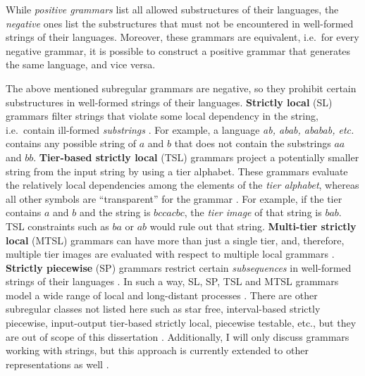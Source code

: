 While \emph{positive grammars} list all allowed substructures of their languages, the \emph{negative} ones list the substructures that must not be encountered in well-formed strings of their languages. Moreover, these grammars are equivalent, i.e.\ for every negative grammar, it is possible to construct a positive grammar that generates the same language, and vice versa.

The above mentioned subregular grammars are negative, so they prohibit certain substructures in well-formed strings of their languages.
\textbf{Strictly local} (SL) grammars filter strings that violate some local dependency in the string, i.e.\ contain ill-formed \emph{substrings} \citep{Heinz-2010-SEL}.
For example, a language \emph{ab, abab, ababab, etc.} contains any possible string of $a$ and $b$ that does not contain the substrings $aa$ and $bb$.
\textbf{Tier-based strictly local} (TSL) grammars project a potentially smaller string from the input string by using a tier alphabet.
These grammars evaluate the relatively local dependencies among the elements of the \emph{tier alphabet}, whereas all other symbols are ``transparent'' for the grammar \citep{HeinzRawal11}.
For example, if the tier contains $a$ and $b$ and the string is $bccacbc$, the \emph{tier image} of that string is $bab$.
TSL constraints such as $ba$ or $ab$ would rule out that string.
\textbf{Multi-tier strictly local} (MTSL) grammars can have more than just a single tier, and, therefore, multiple tier images are evaluated with respect to multiple local grammars \citep{DeSantoGraf19FG}.
\textbf{Strictly piecewise} (SP) grammars restrict certain \emph{subsequences} in well-formed strings of their languages \citep{Rogers-HeinzEtAl-2010-LPTSS,Heinz10ldp}.
In such a way, SL, SP, TSL and MTSL grammars model a wide range of local and long-distant processes \citep{Heinz11part1,HeinzRawal11,Heinz-Lai-2013-VHS,AksenovaEtAl16,ChandleeHeinz2018}.
There are other subregular classes not listed here such as star free, interval-based strictly piecewise, input-output tier-based strictly local, piecewise testable, etc., but they are out of scope of this dissertation \citep{Lawson2003,Graf18NELS}.
Additionally, I will only discuss grammars working with strings, but this approach is currently extended to other representations as well \citep{chandlee-etal-2019-learning,chandlee-jardine-2019-autosegmental}.

